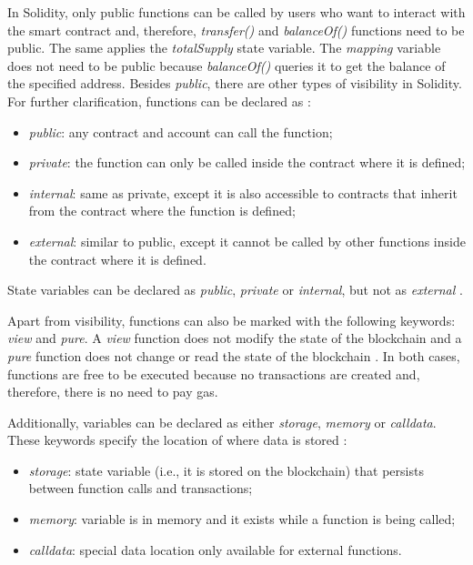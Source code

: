 \documentclass[runningheads]{llncs}
\begin{document}
In Solidity, only public functions can be called by users who want to interact with the smart contract and, therefore, \textit{transfer()} and \textit{balanceOf()} functions need to be public. The same applies the \textit{totalSupply} state variable. The \textit{mapping} variable does not need to be public because \textit{balanceOf()} queries it to get the balance of the specified address. Besides \textit{public}, there are other types of visibility in Solidity. For further clarification, functions can be declared as \cite{solidity_example}:
\begin{itemize}
    \item \textit{public}: any contract and account can call the function;
    \item \textit{private}: the function can only be called inside the contract where it is defined;
    \item \textit{internal}: same as private, except it is also accessible to contracts that inherit from the contract where the function is defined;
    \item \textit{external}: similar to public, except it cannot be called by other functions inside the contract where it is defined.
\end{itemize}

State variables can be declared as \textit{public}, \textit{private} or \textit{internal}, but not as \textit{external} \cite{solidity_example}.

Apart from visibility, functions can also be marked with the following keywords: \textit{view} and \textit{pure}. A \textit{view} function does not modify the state of the blockchain and a \textit{pure} function does not change or read the state of the blockchain \cite{solidity_example}. In both cases, functions are free to be executed because no transactions are created and, therefore, there is no need to pay gas.

Additionally, variables can be declared as either \textit{storage}, \textit{memory} or \textit{calldata}. These keywords specify the location of where data is stored \cite{solidity_example}:
\begin{itemize}
    \item \textit{storage}: state variable (i.e., it is stored on the blockchain) that persists between function calls and transactions;
    \item \textit{memory}: variable is in memory and it exists while a function is being called;
    \item \textit{calldata}: special data location only available for external functions.
\end{itemize}
\end{document}
